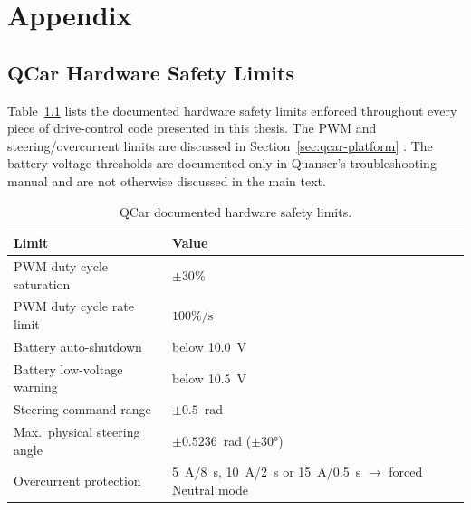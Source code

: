 \chapter{Appendix}
\label{ch:appendix}


\section{QCar Hardware Safety Limits}
\label{app:safety-limits}

Table~\ref{tab:app-safety-limits} lists the documented hardware
safety limits enforced throughout every piece of drive-control code
presented in this thesis. The PWM and steering/overcurrent limits are
discussed in Section~\ref{sec:qcar-platform}
\cite{quanser2023qcar,quanser2023troubleshooting}. The battery
voltage thresholds are documented only in Quanser's troubleshooting
manual \cite{quanser2023troubleshooting} and are not otherwise
discussed in the main text.

\begin{table}[htbp]
  \centering
  \caption{QCar documented hardware safety limits.}
  \label{tab:app-safety-limits}
  \begin{tabular}{@{}ll@{}}
    \toprule
    Limit & Value \\
    \midrule
    PWM duty cycle saturation & $\pm 30\%$ \\
    PWM duty cycle rate limit & $100\%/\mathrm{s}$ \\
    Battery auto-shutdown & below \SI{10.0}{\volt} \\
    Battery low-voltage warning & below \SI{10.5}{\volt} \\
    Steering command range & $\pm 0.5$~rad \\
    Max.\ physical steering angle & $\pm 0.5236$~rad ($\pm\ang{30}$) \\
    Overcurrent protection & \SI{5}{\ampere}/\SI{8}{\second}, \SI{10}{\ampere}/\SI{2}{\second} or \SI{15}{\ampere}/\SI{0.5}{\second} $\to$ forced Neutral mode \\
    \bottomrule
  \end{tabular}
\end{table}

